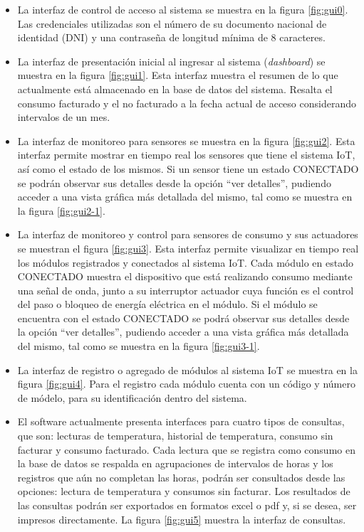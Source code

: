 \begin{itemize}
\item La interfaz de control de acceso al sistema se muestra en la figura \ref{fig:gui0}. Las credenciales utilizadas son el número de su documento nacional de identidad (DNI) y una contraseña de longitud mínima de 8 caracteres.

\item La interfaz de presentación inicial al ingresar al sistema (\emph{dashboard}) se muestra en la figura \ref{fig:gui1}. Esta interfaz muestra el resumen de lo que actualmente está almacenado en la base de datos del sistema. Resalta el consumo facturado y el no facturado a la fecha actual de acceso considerando intervalos de un mes.

\item La interfaz de monitoreo para sensores se muestra en la figura \ref{fig:gui2}. Esta interfaz permite mostrar en tiempo real los sensores que tiene el sistema IoT, así como el estado de los mismos. Si un sensor tiene un estado CONECTADO se podrán observar sus detalles desde la opción ``ver detalles'', pudiendo acceder a una vista gráfica más detallada del mismo, tal como se muestra en la figura \ref{fig:gui2-1}.

\item La interfaz de monitoreo y control para sensores de consumo y sus actuadores se muestran el figura \ref{fig:gui3}. Esta interfaz permite visualizar en tiempo real los módulos registrados y conectados al sistema IoT. Cada módulo en estado CONECTADO muestra el dispositivo que está realizando consumo mediante una señal de onda, junto a su interruptor actuador cuya función es el control del paso o bloqueo de energía eléctrica en el módulo. Si el módulo se encuentra con el estado CONECTADO se podrá observar sus detalles desde la opción ``ver detalles'', pudiendo acceder a una vista gráfica más detallada del mismo, tal como se muestra en la figura \ref{fig:gui3-1}.

\item La interfaz de registro o agregado de módulos al sistema IoT se muestra en la figura \ref{fig:gui4}. Para el registro cada módulo cuenta con un código y número de módelo, para su identificación dentro del sistema.

\item El software actualmente presenta interfaces para cuatro tipos de consultas, que son: lecturas de temperatura, historial de temperatura, consumo sin facturar y consumo facturado. Cada lectura que se registra como consumo en la base de datos se respalda en agrupaciones de intervalos de horas y los registros que aún no completan las horas, podrán ser consultados desde las opciones: lectura de temperatura y consumos sin facturar. Los resultados de las consultas podrán ser exportados en formatos excel o pdf y, si se desea, ser impresos directamente. La figura \ref{fig:gui5} muestra la interfaz de consultas.


\end{itemize}
